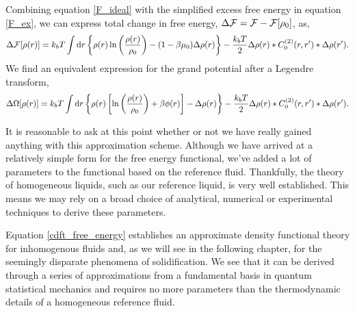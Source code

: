 %
Combining equation \ref{F_ideal} with the simplified excess free energy in
equation \ref{F_ex}, we can express total change in free energy, $\Delta \mathcal{F} =
\mathcal{F} - \mathcal{F}[\rho_0]$, as,
%
\begin{equation}
    \label{cdft_free_energy}
    \Delta \mathcal{F} [\rho(r)] 
        = k_b T\int \mathrm{d}r 
            \left\lbrace \rho(r) \ln\left(\frac{\rho(r)}{\rho_0} \right) 
            - (1-\beta\mu_0) \Delta \rho(r)\right\rbrace 
        - \frac{k_b T}{2}\Delta \rho(r) \ast C_0^{(2)}(r, r^\prime) 
            \ast \Delta \rho(r^\prime).
\end{equation}
%
We find an equivalent expression for the grand potential after a Legendre
transform,
%
\begin{equation}
    \label{cdft_grand_potential}
    \Delta \Omega [\rho(r)]
        = k_b T\int \mathrm{d}r 
            \left\lbrace \rho(r) \left[\ln\left(\frac{\rho(r)}{\rho_0} \right) 
            + \beta\phi(r) \right] -  \Delta \rho(r)\right\rbrace 
        - \frac{k_b T}{2}\Delta \rho(r) \ast C_0^{(2)}(r, r^\prime) 
            \ast \Delta \rho(r^\prime).
\end{equation}


It is reasonable to ask at this point whether or not we have really gained
anything with this approximation scheme.  Although we have arrived at a
relatively simple form for the free energy functional, we've added a lot of
parameters to the functional based on the reference fluid.  Thankfully, the
theory of homogeneous liquids, such as our reference liquid, is very well
established.  This means we may rely on a broad choice of analytical,
numerical or experimental techniques to derive these parameters.

Equation \ref{cdft_free_energy} establishes an approximate density functional
theory for inhomogenous fluids and, as we will see in the following chapter,
for the seemingly disparate phenomena of solidification. We see that it can be
derived through a series of approximations from a fundamental basis in quantum
statistical mechanics and requires no more parameters than the thermodynamic
details of a homogeneous reference fluid.
